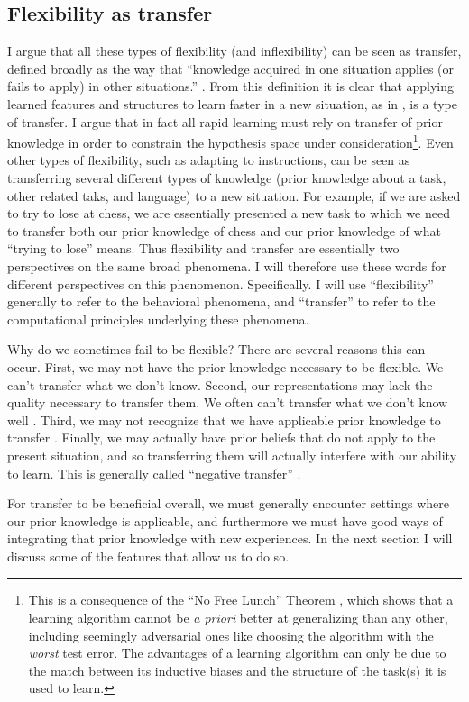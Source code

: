 \subsection{Flexibility as transfer}
I argue that all these types of flexibility (and inflexibility) can be seen as transfer, defined broadly as the way that ``knowledge acquired in one situation applies (or fails to apply) in other situations.'' \citep{Singley1989}. From this definition it is clear that applying learned features and structures to learn faster in a new situation, as in \citet{Bourne1970}, is a type of transfer. I argue that in fact all rapid learning must rely on transfer of prior knowledge in order to constrain the hypothesis space under consideration\footnote{This is a consequence of the ``No Free Lunch'' Theorem \citep{Wolpert1996}, which shows that a learning algorithm cannot be \emph{a priori} better at generalizing than any other, including seemingly adversarial ones like choosing the algorithm with the \emph{worst} test error. The advantages of a learning algorithm can only be due to the match between its inductive biases and the structure of the task(s) it is used to learn.}. Even other types of flexibility, such as adapting to instructions, can be seen as transferring several different types of knowledge (prior knowledge about a task, other related taks, and language) to a new situation. For example, if we are asked to try to lose at chess, we are essentially presented a new task to which we need to transfer both our prior knowledge of chess and our prior knowledge of what ``trying to lose'' means. Thus flexibility and transfer are essentially two perspectives on the same broad phenomena. I will therefore use these words for different perspectives on this phenomenon. Specifically. I will use ``flexibility'' generally to refer to the behavioral phenomena, and ``transfer'' to refer to the computational principles underlying these phenomena. \par  
Why do we sometimes fail to be flexible? There are several reasons this can occur. First, we may not have the prior knowledge necessary to be flexible. We can't transfer what we don't know. Second, our representations may lack the quality necessary to transfer them. We often can't transfer what we don't know well \citep[c.f.]{Hazzan1999, Weber2001}. Third, we may not recognize that we have applicable prior knowledge to transfer \citep{Detterman1993}. Finally, we may actually have prior beliefs that do not apply to the present situation, and so transferring them will actually interfere with our ability to learn. This is generally called ``negative transfer'' \citep{Singley1989}. \par
For transfer to be beneficial overall, we must generally encounter settings where our prior knowledge is applicable, and furthermore we must have good ways of integrating that prior knowledge with new experiences. In the next section I will discuss some of the features that allow us to do so. \par

